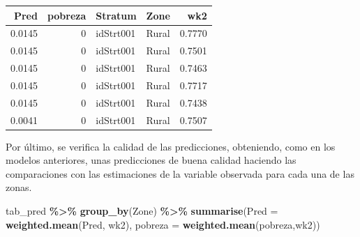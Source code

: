 \documentclass[
  spanish,
  12pt,
]{book}
\newenvironment{Shaded}{\begin{snugshade}}{\end{snugshade}}
\newcommand{\AttributeTok}[1]{\textcolor[rgb]{0.13,0.29,0.53}{#1}}
\newcommand{\DataTypeTok}[1]{\textcolor[rgb]{0.13,0.29,0.53}{#1}}
\newcommand{\DecValTok}[1]{\textcolor[rgb]{0.00,0.00,0.81}{#1}}
\newcommand{\FunctionTok}[1]{\textcolor[rgb]{0.13,0.29,0.53}{\textbf{#1}}}
\newcommand{\NormalTok}[1]{#1}
\newcommand{\OtherTok}[1]{\textcolor[rgb]{0.56,0.35,0.01}{#1}}
\newcommand{\SpecialCharTok}[1]{\textcolor[rgb]{0.81,0.36,0.00}{\textbf{#1}}}
\newcommand{\StringTok}[1]{\textcolor[rgb]{0.31,0.60,0.02}{#1}}
\begin{document}
\begin{Shaded}
\end{Shaded}

\begin{tabular}{r|r|l|l|r}
\hline
Pred & pobreza & Stratum & Zone & wk2\\
\hline
0.0145 & 0 & idStrt001 & Rural & 0.7770\\
\hline
0.0145 & 0 & idStrt001 & Rural & 0.7501\\
\hline
0.0145 & 0 & idStrt001 & Rural & 0.7463\\
\hline
0.0145 & 0 & idStrt001 & Rural & 0.7717\\
\hline
0.0145 & 0 & idStrt001 & Rural & 0.7438\\
\hline
0.0041 & 0 & idStrt001 & Rural & 0.7507\\
\hline
\end{tabular}

Por último, se verifica la calidad de las predicciones, obteniendo, como en los modelos anteriores, unas predicciones de buena calidad haciendo las comparaciones con las estimaciones de la variable observada para cada una de las zonas.

\begin{Shaded}
\begin{Highlighting}[]
\NormalTok{tab\_pred }\SpecialCharTok{\%\textgreater{}\%} \FunctionTok{group\_by}\NormalTok{(Zone) }\SpecialCharTok{\%\textgreater{}\%} 
  \FunctionTok{summarise}\NormalTok{(}\AttributeTok{Pred =} \FunctionTok{weighted.mean}\NormalTok{(Pred, wk2), }
            \AttributeTok{pobreza =} \FunctionTok{weighted.mean}\NormalTok{(pobreza,wk2))}
\end{Highlighting}
\end{Shaded}
\end{document}
